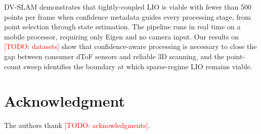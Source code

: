 \documentclass[journal]{IEEEtran}
\newcommand{\todo}[1]{\textcolor{red}{[TODO: #1]}}
\begin{document}
DV-SLAM demonstrates that tightly-coupled LIO is viable with fewer than 500 points per frame when confidence metadata guides every processing stage, from point selection through state estimation. The pipeline runs in real time on a mobile processor, requiring only Eigen and no camera input. Our results on \todo{datasets} show that confidence-aware processing is necessary to close the gap between consumer dToF sensors and reliable 3D scanning, and the point-count sweep identifies the boundary at which sparse-regime LIO remains viable.

\section*{Acknowledgment}
The authors thank \todo{acknowledgments}.

\end{document}
